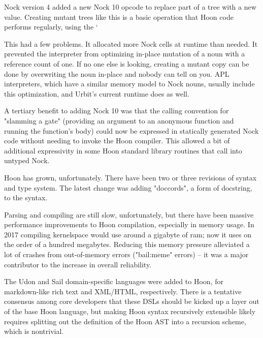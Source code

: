 \documentclass[twoside]{article}
\begin{document}
Nock version 4 added a new Nock 10 opcode to replace part of a tree with a new value.  Creating mutant trees like this is a basic operation that Hoon code performs regularly, using the `%

This had a few problems.  It allocated more Nock cells at runtime than needed.  It prevented the interpreter from optimizing in-place mutation of a noun with a reference count of one.  If no one else is looking, creating a mutant copy can be done by overwriting the noun in-place and nobody can tell on you.  APL interpreters, which have a similar memory model to Nock nouns, usually include this optimization, and Urbit's current runtime does as well.

A tertiary benefit to adding Nock 10 was that the calling convention for "slamming a gate" (providing an argument to an anonymous function and running the function's body) could now be expressed in statically generated Nock code without needing to invoke the Hoon compiler.  This allowed a bit of additional expressivity in some Hoon standard library routines that call into untyped Nock.

Hoon has grown, unfortunately.  There have been two or three revisions of syntax and type system.  The latest change was adding "doccords", a form of docstring, to the syntax.

Parsing and compiling are still slow, unfortunately, but there have been massive performance improvements to Hoon compilation, especially in memory usage.  In 2017 compiling kernelspace would use around a gigabyte of {\sc ram}; now it uses on the order of a hundred megabytes.  Reducing this memory pressure alleviated a lot of crashes from out-of-memory errors ("bail:meme" errors) – it was a major contributor to the increase in overall reliability.

The Udon and Sail domain-specific languages were added to Hoon, for markdown-like rich text and XML/HTML, respectively.  There is a tentative consensus among core developers that these DSLs should be kicked up a layer out of the base Hoon language, but making Hoon syntax recursively extensible likely requires splitting out the definition of the Hoon AST into a recursion scheme, which is nontrivial.
\end{document}
